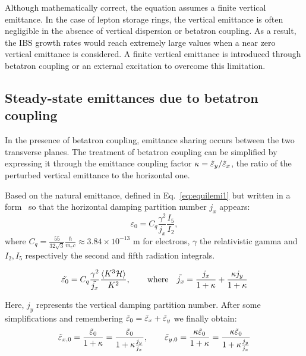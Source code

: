 Although mathematically correct, the equation assumes a finite vertical emittance. In the case of lepton storage rings, the vertical emittance is often negligible in the absence of vertical dispersion or betatron coupling. As a result, the IBS growth rates would reach extremely large values when a near zero vertical emittance is considered. A finite vertical emittance is introduced through betatron coupling or an external excitation to overcome this limitation.

\subsection{Steady-state emittances due to betatron coupling}

In the presence of betatron coupling, emittance sharing occurs between the two transverse planes. The treatment of betatron coupling can be simplified by expressing it through the emittance coupling factor $\kappa = \Tilde{\varepsilon}_y/\Tilde{\varepsilon}_x$, the ratio of the perturbed vertical emittance to the horizontal one.

Based on the natural emittance, defined in Eq.~\eqref{eq:equilemi1} but written in a form~\cite{Lee:2018fhc} so that the horizontal damping partition number $j_x$ appears:
\begin{equation*}
    \varepsilon_0 = C_q \frac{\gamma^2}{j_x} \frac{I_5}{I_2},
\end{equation*}
where $C_q = \frac{55}{32 \sqrt{3}} \frac{\hbar}{m_e c} \approx 3.84 \times 10^{-13}$ m for electrons, $\gamma$ the relativistic gamma and $I_2,I_5$ respectively the second and fifth radiation integrals.

\begin{equation}
    \Tilde{\varepsilon_0} = C_q \frac{\gamma^2}{\Tilde{j_x}} \frac{\langle K^3 \mathcal{H} \rangle}{K^2}, \qquad \mathrm{where} \quad \Tilde{j_x} = \frac{j_x}{1 + \kappa} + \frac{\kappa j_y}{1 + \kappa}
\label{eq:j_kappa}
\end{equation}

Here, $j_y$ represents the vertical damping partition number.
After some simplifications and remembering $\Tilde{\varepsilon}_0 = \Tilde{\varepsilon}_x + \Tilde{\varepsilon}_y$ we finally obtain:
\begin{equation}
    \Tilde{\varepsilon}_{x,0} = \frac{\Tilde{\varepsilon}_0}{1 + \kappa} = \frac{\Tilde{\varepsilon}_0}{1 + \kappa \frac{j_y}{j_x}}, \qquad \Tilde{\varepsilon}_{y,0} = \frac{\kappa \Tilde{\varepsilon}_0}{1 + \kappa} = \frac{\kappa \Tilde{\varepsilon}_0}{1 + \kappa \frac{j_y}{j_x}}
\label{eq:eps_kappa}
\end{equation}

